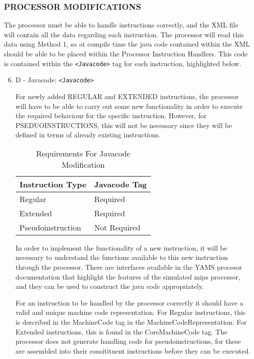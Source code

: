 \subsubsection{PROCESSOR MODIFICATIONS}

The processor must be able to handle instructions correctly, and the XML file will contain all the data regarding each instruction. The processor will read this data using Method 1, so at compile time the java code contained within the XML should be able to be placed within the Processor Instruction Handlers. This code is contained within the \verb"<Javacode>" tag for each instruction, highlighted below.

\begin{enumerate}
\setcounter{enumi}{5}

\item D - Javacode: \verb"<Javacode>"

For newly added REGULAR and EXTENDED instructions, the processor will have to be able to carry out some new functionality in order to execute the required behaviour for the specific instruction. However, for PSEDUOINSTRUCTIONS, this will not be necessary since they will be defined in terms of already existing instructions.



\begin{table}[]
\begin{center}
	\begin{tabular}{|l|l|}
	\hline
	Instruction Type	&	Javacode Tag \\
	\hline
	Regular				&	Required \\
	Extended			&	Required \\
	Pseudoinstruction	&	Not Required \\
	\hline
	\end{tabular}
\caption{Requirements For Javacode Modification}
\end{center}
\end{table}

In order to implement the functionality of a new instruction, it will be necessary to understand the functions available to this new instruction through the processor. There are interfaces available in the YAMS procesor documentation that highlight the features of the simulated mips processor, and they can be used to construct the java code appropriately.

For an instruction to be handled by the processor correctly it should have a valid and unique machine code representation. For Regular instructions, this is described in the MachineCode tag in the MachineCodeRepresentation. For Extended instructions, this is found in the CoreMachineCode tag.
The processor does not generate handling code for pseudoinstructions, for these are assembled into their consitituent instructions before they can be executed.


\end{enumerate}
